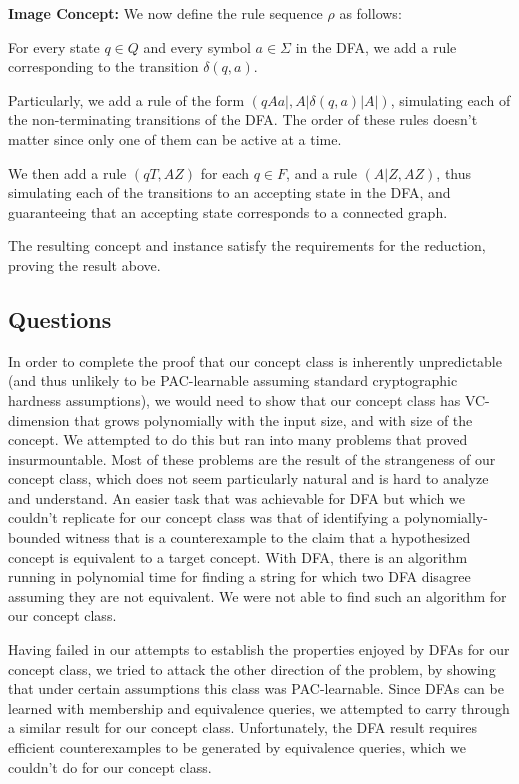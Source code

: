 \documentclass[]{article}
\begin{document}
\textbf{Image Concept:}
We now define the rule sequence $\rho$ as follows:

For every state $q\in Q$ and every symbol $a\in \Sigma$ in the DFA, we add a rule corresponding to the transition $\delta(q,a)$.

Particularly, we add a rule of the form $(qAa|, A|\delta(q,a)|A|)$, simulating
each of the non-terminating transitions of the DFA. The order of
these rules doesn't matter since only one of them can be active at a time.

We then add a rule $(qT, AZ)$ for each $q\in F$, and a rule $(A|Z,AZ)$, thus
simulating each of the transitions to an accepting state in the DFA, and
guaranteeing that an accepting state corresponds to a connected graph.

The resulting concept and instance satisfy the requirements for the reduction,
proving the result above.

\subsection{Questions}
In order to complete the proof that our concept class is inherently unpredictable (and thus unlikely to be PAC-learnable assuming standard cryptographic hardness assumptions), we would need to show that our concept class has VC-dimension that grows polynomially with the input size, and with size of the concept. We attempted to do this but ran into many problems that proved insurmountable. Most of these problems are the result of the strangeness of our concept class, which does not seem particularly natural and is hard to analyze and understand. An easier task that was achievable for DFA but which we couldn't replicate for our concept class was that of identifying a polynomially-bounded witness that is a counterexample to the claim that a hypothesized concept is equivalent to a target concept. With DFA, there is an algorithm running in polynomial time for finding a string for which two DFA disagree assuming they are not equivalent. We were not able to find such an algorithm for our concept class.

Having failed in our attempts to establish the properties enjoyed by DFAs for our concept class, we tried to attack the other direction of the problem, by showing that under certain assumptions this class was PAC-learnable. Since DFAs can be learned with membership and equivalence queries, we attempted to carry through a similar result for our concept class. Unfortunately, the DFA result requires efficient counterexamples to be generated by equivalence queries, which we couldn't do for our concept class.
\end{document}
